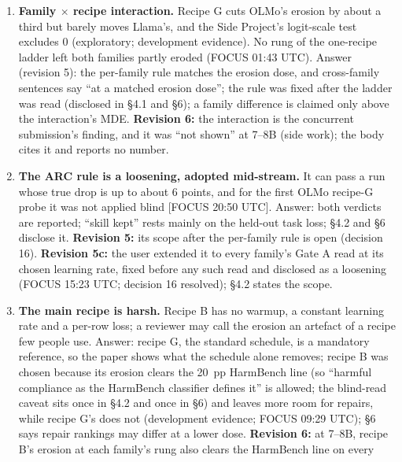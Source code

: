 \documentclass{article}
\theoremstyle{plain}
\theoremstyle{definition}
\theoremstyle{remark}
\begin{document}
\begin{enumerate}
        longer says that recipe G erodes less at all; it gives the design fact
        (it halves the mean learning rate) and ``not a general fix''.
  \item \textbf{Family $\times$ recipe interaction.} Recipe G cuts OLMo's
        erosion by about a third but barely moves Llama's, and the Side
        Project's logit-scale test excludes 0 (exploratory; development
        evidence). No rung of the one-recipe ladder left both families partly
        eroded (FOCUS 01:43 UTC). Answer (revision 5): the per-family rule
        matches the erosion dose, and cross-family sentences say ``at a matched
        erosion dose''; the rule was fixed after the ladder was read (disclosed
        in \S{}4.1 and \S{}6); a family difference is claimed only above the
        interaction's MDE. \textbf{Revision 6:} the interaction is the
        concurrent submission's finding, and it was ``not shown'' at 7--8B (side
        work); the body cites it and reports no number.
  \item \textbf{The ARC rule is a loosening, adopted mid-stream.} It can pass a
        run whose true drop is up to about 6 points, and for the first OLMo
        recipe-G probe it was not applied blind [FOCUS 20:50 UTC]. Answer: both
        verdicts are reported; ``skill kept'' rests mainly on the held-out task
        loss; \S{}4.2 and \S{}6 disclose it. \textbf{Revision 5:} its scope
        after the per-family rule is open (decision 16). \textbf{Revision 5c:}
        the user extended it to every family's Gate A read at its chosen
        learning rate, fixed before any such read and disclosed as a loosening
        (FOCUS 15:23 UTC; decision 16 resolved); \S{}4.2 states the scope.
  \item \textbf{The main recipe is harsh.} Recipe B has no warmup, a constant
        learning rate and a per-row loss; a reviewer may call the erosion an
        artefact of a recipe few people use. Answer: recipe G, the standard
        schedule, is a mandatory reference, so the paper shows what the schedule
        alone removes; recipe B was chosen because its erosion clears the 20~pp
        HarmBench line (so ``harmful compliance as the HarmBench classifier
        defines it'' is allowed; the blind-read caveat sits once in \S{}4.2 and
        once in \S{}6) and leaves more room for repairs, while recipe G's does
        not (development evidence; FOCUS 09:29 UTC); \S{}6 says repair rankings
        may differ at a lower dose. \textbf{Revision 6:} at 7--8B, recipe B's
        erosion at each family's rung also clears the HarmBench line on every

\end{enumerate}
\end{document}
